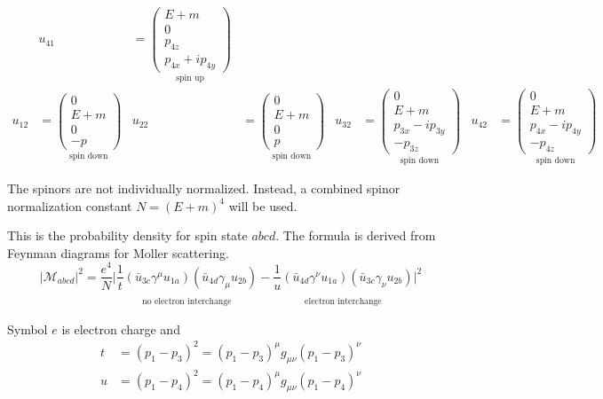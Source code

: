 \documentclass[12pt]{article}
\begin{document}
\begin{align*}
&
u_{41}&=
\underset{\text{spin up}}
{\begin{pmatrix}E+m\\0\\p_{4z}\\p_{4x}+ip_{4y}\end{pmatrix}}
\\[1ex]
u_{12}&=
\underset{\text{spin down}}
{
\begin{pmatrix}0\\E+m\\0\\-p\end{pmatrix}
}
&
u_{22}&=
\underset{\text{spin down}}
{
\begin{pmatrix}0\\E+m\\0\\p\end{pmatrix}
}
&
u_{32}&=
\underset{\text{spin down}}
{
\begin{pmatrix}0\\E+m\\p_{3x}-ip_{3y}\\-p_{3z}\end{pmatrix}
}
&
u_{42}&=
\underset{\text{spin down}}
{
\begin{pmatrix}0\\E+m\\p_{4x}-ip_{4y}\\-p_{4z}\end{pmatrix}
}
\end{align*}

The spinors are not individually normalized.
Instead, a combined spinor normalization constant $N=(E+m)^4$ will be used.

\bigskip
This is the probability density for spin state $abcd$.
The formula is derived from Feynman diagrams for Moller scattering.
\begin{equation*}
|\mathcal{M}_{abcd}|^2=\frac{e^4}{N}
\bigg|
\underset{\substack{\\[1ex]\text{no electron interchange}}}
{\frac{1}{t}(\bar{u}_{3c}\gamma^\mu u_{1a})(\bar{u}_{4d}\gamma_\mu u_{2b})}
-
\underset{\substack{\\[1ex]\text{electron interchange}}}
{\frac{1}{u}(\bar{u}_{4d}\gamma^\nu u_{1a})(\bar{u}_{3c}\gamma_\nu u_{2b})}
\bigg|^2
\end{equation*}

Symbol $e$ is electron charge and
\begin{align*}
t&=(p_1-p_3)^2=(p_1-p_3)^\mu g_{\mu\nu}(p_1-p_3)^\nu
\\
u&=(p_1-p_4)^2=(p_1-p_4)^\mu g_{\mu\nu}(p_1-p_4)^\nu
\end{align*}
\end{document}
